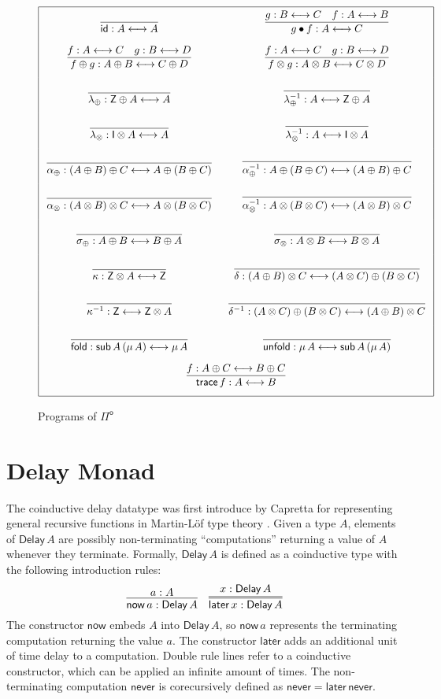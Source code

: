 \documentclass[runningheads]{llncs}
\newcommand{\Pio}{$\mathsf{\Pi}^{\mathsf{o}}$}
\newcommand{\id}{\mathsf{id}}
\newcommand{\lr}{\longleftrightarrow}
\newcommand{\fold}{\mathsf{fold}}
\newcommand{\unfold}{\mathsf{unfold}}
\newcommand{\sub}{\mathsf{sub}}
\newcommand{\trace}{\mathsf{trace}}
\newcommand{\Z}{\mathsf{Z}}
\newcommand{\I}{\mathsf{I}}
\newcommand{\Delay}{\mathsf{Delay}\,}
\newcommand{\now}{\mathsf{now}}
\newcommand{\later}{\mathsf{later}}
\newcommand{\never}{\mathsf{never}}
\begin{document}
\begin{figure}
\[
\arraycolsep=8pt\def\arraystretch{2.8}
\begin{array}{|cc|}
\hline
\infer{\id : A \lr A}{}
& \infer{g \bullet f : A \lr C}{g : B \lr C & f : A \lr B} \\
\infer{f \oplus g : A \oplus B \lr C \oplus D}{f : A \lr C & g : B \lr D} 
& \infer{f \otimes g : A \otimes B \lr C \otimes D}{f : A \lr C & g : B \lr D} \\
\infer{\lambda_{\oplus} : \Z \oplus A \lr A}{}
& \infer{\lambda_{\oplus}^{-1} : A \lr \Z \oplus A}{} \\
\infer{\lambda_{\otimes} : \I \otimes A \lr A}{}
& \infer{\lambda_{\otimes}^{-1} : A \lr \I \otimes A}{} \\
\infer{\alpha_{\oplus} : (A \oplus B) \oplus C \lr A \oplus (B \oplus C)}{}
& \infer{\alpha_{\oplus}^{-1} : A \oplus (B \oplus C) \lr (A \oplus B) \oplus C}{} \\
\infer{\alpha_{\otimes} : (A \otimes B) \otimes C \lr A \otimes (B \otimes C)}{}
& \infer{\alpha_{\otimes}^{-1} : A \otimes (B \otimes C) \lr (A \otimes B) \otimes C}{} \\
\infer{\sigma_{\oplus} : A \oplus B \lr B \oplus A}{}
& \infer{\sigma_{\otimes} : A \otimes B \lr B \otimes A}{} \\
\infer{\kappa : \Z \otimes A \lr \Z}{} 
& \infer{\delta : (A \oplus B) \otimes C \lr (A \otimes C) \oplus (B \otimes C)}{} \\
\infer{\kappa^{-1} : \Z \lr \Z \otimes A}{}
& \infer{\delta^{-1} : (A \otimes C) \oplus (B \otimes C)  \lr (A \oplus B) \otimes C}{} \\
\infer{\fold : \sub \, A \, (\mu \,A) \lr \mu \,A}{} 
& \infer{\unfold : \mu\,A \lr \sub \, A \, (\mu \,A)}{} \\
\multicolumn{2}{|c|}{\infer{\trace \,f: A \lr B}{f : A \oplus C \lr B \oplus C}} \\
\hline
\end{array}
\]
\caption{Programs of \Pio}
\label{fig:programs}
\end{figure}

\section{Delay Monad}\label{sec:delay}

The coinductive delay datatype was first introduce by Capretta for
representing general recursive functions in Martin-L\"of type theory
\cite{Capretta05}.  Given a type $A$, elements of $\Delay A$ are
possibly non-terminating ``computations'' returning a value of $A$
whenever they terminate. Formally, $\Delay A$ is defined as a
coinductive type with the following introduction rules:
\[
\infer{\now\,a : \Delay A}{a : A}
\quad
\infer={\later\,x : \Delay A}{x : \Delay A}
\]
The constructor $\now$ embeds $A$ into $\Delay A$, so $\now\,a$
represents the terminating computation returning the value $a$. The
constructor $\later$ adds an additional unit of time delay to a
computation. Double rule lines refer to a coinductive constructor,
which can be applied an infinite amount of times.
The non-terminating computation $\never$
is corecursively defined as $\never = \later \,\never$.
\end{document}
